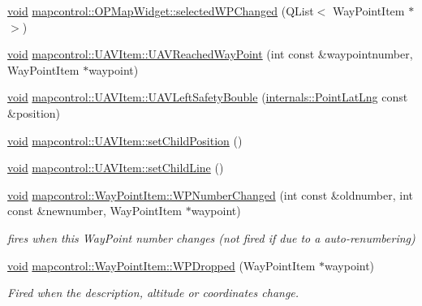 \begin{DoxyCompactItemize}
\hyperlink{group___u_a_v_objects_plugin_ga444cf2ff3f0ecbe028adce838d373f5c}{void} \hyperlink{group___o_p_map_widget_ga173f22c1dd41ac235400d05eb42eeff6}{mapcontrol\-::\-O\-P\-Map\-Widget\-::selected\-W\-P\-Changed} (\-Q\-List$<$ \-Way\-Point\-Item $\ast$ $>$)
\item 
\hyperlink{group___u_a_v_objects_plugin_ga444cf2ff3f0ecbe028adce838d373f5c}{void} \hyperlink{group___o_p_map_widget_gabf2d7a7d3651230d841d2d0e2477bcad}{mapcontrol\-::\-U\-A\-V\-Item\-::\-U\-A\-V\-Reached\-Way\-Point} (int const \&waypointnumber, \-Way\-Point\-Item $\ast$waypoint)
\item 
\hyperlink{group___u_a_v_objects_plugin_ga444cf2ff3f0ecbe028adce838d373f5c}{void} \hyperlink{group___o_p_map_widget_ga845584d53f92c89f8f657d7d13630187}{mapcontrol\-::\-U\-A\-V\-Item\-::\-U\-A\-V\-Left\-Safety\-Bouble} (\hyperlink{structinternals_1_1_point_lat_lng}{internals\-::\-Point\-Lat\-Lng} const \&position)
\item 
\hyperlink{group___u_a_v_objects_plugin_ga444cf2ff3f0ecbe028adce838d373f5c}{void} \hyperlink{group___o_p_map_widget_ga68e3f8435620e746ad771a99666216dc}{mapcontrol\-::\-U\-A\-V\-Item\-::set\-Child\-Position} ()
\item 
\hyperlink{group___u_a_v_objects_plugin_ga444cf2ff3f0ecbe028adce838d373f5c}{void} \hyperlink{group___o_p_map_widget_gafcbd9466c92579c43c5be53eaca75147}{mapcontrol\-::\-U\-A\-V\-Item\-::set\-Child\-Line} ()
\item 
\hyperlink{group___u_a_v_objects_plugin_ga444cf2ff3f0ecbe028adce838d373f5c}{void} \hyperlink{group___o_p_map_widget_ga259ccf14fc1866f99af110b4b0334d74}{mapcontrol\-::\-Way\-Point\-Item\-::\-W\-P\-Number\-Changed} (int const \&oldnumber, int const \&newnumber, \-Way\-Point\-Item $\ast$waypoint)
\begin{DoxyCompactList}\small\item\em fires when this \-Way\-Point number changes (not fired if due to a auto-\/renumbering) \end{DoxyCompactList}\item 
\hyperlink{group___u_a_v_objects_plugin_ga444cf2ff3f0ecbe028adce838d373f5c}{void} \hyperlink{group___o_p_map_widget_gae08b9a33683cbdb80ac273d6dcd75837}{mapcontrol\-::\-Way\-Point\-Item\-::\-W\-P\-Dropped} (\-Way\-Point\-Item $\ast$waypoint)
\begin{DoxyCompactList}\small\item\em \-Fired when the description, altitude or coordinates change. \end{DoxyCompactList}\item 

\end{DoxyCompactItemize}
